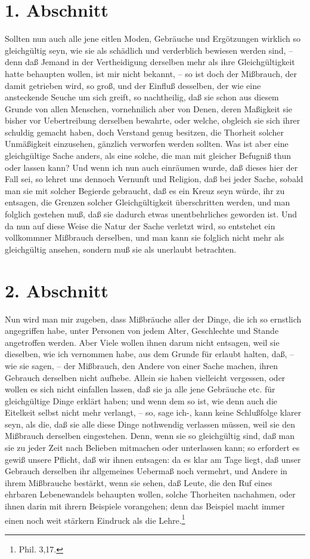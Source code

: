 \section{1. Abschnitt}

Sollten nun auch alle jene eitlen Moden, Gebräuche und Ergötzungen wirklich so gleichgültig seyn, wie sie als schädlich und verderblich bewiesen werden sind, -- denn daß Jemand in der Vertheidigung derselben mehr als ihre Gleichgültigkeit hatte behaupten wollen, ist mir nicht bekannt, -- so ist doch der Mißbrauch, der damit getrieben wird, so groß, und der Einfluß desselben, der wie eine ansteckende Seuche um sich greift, so nachtheilig, daß sie schon aus diesem Grunde von allen Menschen, vornehnilich aber von Denen, deren Maßigkeit sie bisher vor Uebertreibung derselben bewahrte, oder welche, obgleich sie sich ihrer schuldig gemacht haben, doch Verstand genug besitzen, die Thorheit solcher Unmäßigkeit einzusehen, gänzlich verworfen werden sollten. Was ist aber eine gleichgültige Sache anders, als eine solche, die man mit gleicher Befugniß thun oder lassen kann? Und wenn ich nun auch einräumen wurde, daß dieses hier der Fall sei, so lehret uns dennoch Vernunft und Religion, daß bei jeder Sache, sobald man sie mit solcher Begierde gebraucht, daß es ein Kreuz seyn würde, ihr zu entsagen, die Grenzen solcher Gleichgültigkeit überschritten werden, und man folglich gestehen muß, daß sie dadurch etwas unentbehrliches geworden ist. Und da nun auf diese Weise die Natur der Sache verletzt wird, so entstehet ein vollkommner Mißbrauch derselben, und man kann sie folglich nicht mehr als gleichgültig ansehen, sondern muß sie als unerlaubt betrachten.

\section{2. Abschnitt}

Nun wird man mir zugeben, dass Mißbräuche aller der Dinge, die ich so ernstlich angegriffen habe, unter Personen von jedem Alter, Geschlechte und Stande angetroffen werden. Aber Viele wollen ihnen darum nicht entsagen, weil sie dieselben, wie ich vernommen habe, aus dem Grunde für erlaubt halten, daß, -- wie sie sagen, -- der Mißbrauch, den Andere von einer Sache  machen, ihren Gebrauch derselben nicht aufhebe. Allein sie haben vielleicht vergessen, oder wollen es sich nicht einfallen lassen, daß sie ja alle jene Gebräuche etc. für gleichgültige Dinge erklärt haben; und wenn dem so ist, wie denn auch die Eitelkeit selbst nicht mehr verlangt, -- so, sage ich-, kann keine Schlußfolge klarer seyn, als die, daß sie alle diese Dinge nothwendig verlassen müssen, weil sie den Mißbrauch derselben eingestehen. Denn, wenn sie so gleichgültig sind, daß man sie zu jeder Zeit nach Belieben mitmachen oder unterlassen kann; so erfordert es gewiß unsere Pflicht, daß wir ihnen entsagen: da es klar am Tage liegt, daß unser Gebrauch derselben ihr allgemeines Uebermaß noch vermehrt, und Andere in ihrem Mißbrauche bestärkt, wenn sie sehen, daß Leute, die den Ruf eines ehrbaren Lebenewandels behaupten wollen, solche Thorheiten nachahmen, oder ihnen darin mit ihrern Beispiele vorangehen; denn das Beispiel macht immer einen noch weit stärkern Eindruck als die Lehre.\footnote{Phil. 3,17.}

